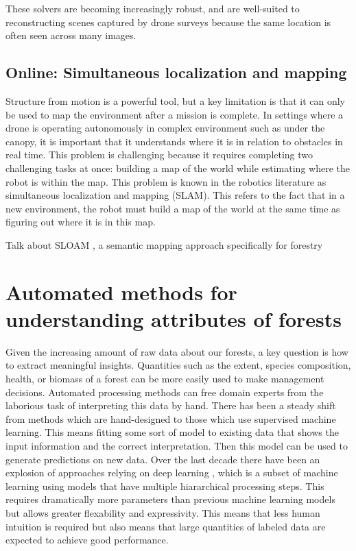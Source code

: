 These solvers are becoming increasingly robust, and are well-suited to reconstructing scenes captured by drone surveys because the same location is often seen across many images.

\subsection{Online: Simultaneous localization and mapping}
Structure from motion is a powerful tool, but a key limitation is that it can only be used to map the environment after a mission is complete. In settings where a drone is operating autonomously in complex environment such as under the canopy, it is important that it understands where it is in relation to obstacles in real time. This problem is challenging because it requires completing two challenging tasks at once: building a map of the world while estimating where the robot is within the map. This problem is known in the robotics literature as simultaneous localization and mapping (SLAM). This refers to the fact that in a new environment, the robot must build a map of the world at the same time as figuring out where it is in this map. 


Talk about SLOAM \cite{Chen2020SLOAM:Inventory}, a semantic mapping approach specifically for forestry 

%    


\section{Automated methods for understanding attributes of forests}
Given the increasing amount of raw data about our forests, a key question is how to extract meaningful insights. Quantities such as the extent, species composition, health, or biomass of a forest can be more easily used to make management decisions. Automated processing methods can free domain experts from the laborious task of interpreting this data by hand. There has been a steady shift from methods which are hand-designed to those which use supervised machine learning. This means fitting some sort of model to existing data that shows the input information and the correct interpretation. Then this model can be used to generate predictions on new data. Over the last decade there have been an explosion of approaches relying on deep learning \cite{Lecun2015DeepLearning}, which is a subset of machine learning using models that have multiple hiararchical processing steps. This requires dramatically more parameters than previous machine learning models but allows greater flexability and expressivity. This means that less human intuition is required but also means that large quantities of labeled data are expected to achieve good performance. 


